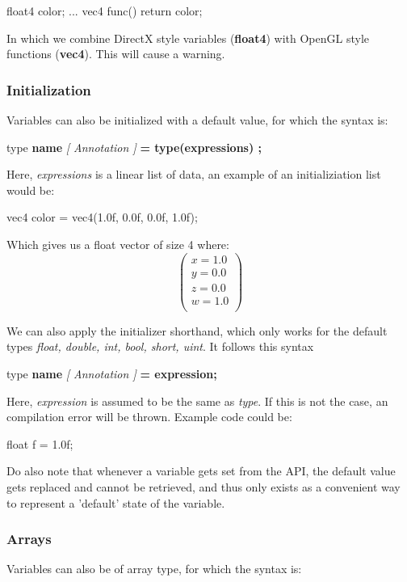 \documentclass{article}
\newcommand{\SyntaxBox}[1]
{	
	\begin{center}
	\colorbox{orange!60}
	{
		\begin{minipage}{\linewidth}
		\hfill
		\begin{tabbing}
		#1
		\end{tabbing}
		\end{minipage}
	}
	\end{center}
}
\begin{document}
\begin{CodeBox}
	float4 color;
	...
	vec4 func()
	{
		return color;
	}
\end{CodeBox}

In which we combine DirectX style variables (\textbf{float4}) with OpenGL style functions (\textbf{vec4}). This will cause a warning. 

\subsubsection{Initialization}
Variables can also be initialized with a default value, for which the syntax is:

\SyntaxBox
{
	type \textbf{name} \textit{[ Annotation ]} \textbf{= type(expressions) ;}
}

Here, \textit{expressions} is a linear list of data, an example of an initializiation list would be:

\begin{CodeBox}
	vec4 color = vec4(1.0f, 0.0f, 0.0f, 1.0f);
\end{CodeBox}

Which gives us a float vector of size 4 where:
\[
	\left(
	\begin{array}{c}
	x = 1.0 \\
	y = 0.0 \\ 
	z = 0.0 \\
	w = 1.0 \\
	\end{array}
	\right)
\]

We can also apply the initializer shorthand, which only works for the default types \textit{float, double, int, bool, short, uint}. It follows this syntax

\SyntaxBox
{
	type \textbf{name} \textit{[ Annotation ]} \textbf{= expression;}
}

Here, \textit{expression} is assumed to be the same as \textit{type}. If this is not the case, an compilation error will be thrown. Example code could be:

\begin{CodeBox}
	float f = 1.0f;
\end{CodeBox}


Do also note that whenever a variable gets set from the API, the default value gets replaced and cannot be retrieved, and thus only exists as a convenient way to represent a 'default' state of the variable.

\subsubsection{Arrays}
Variables can also be of array type, for which the syntax is:
\end{document}
